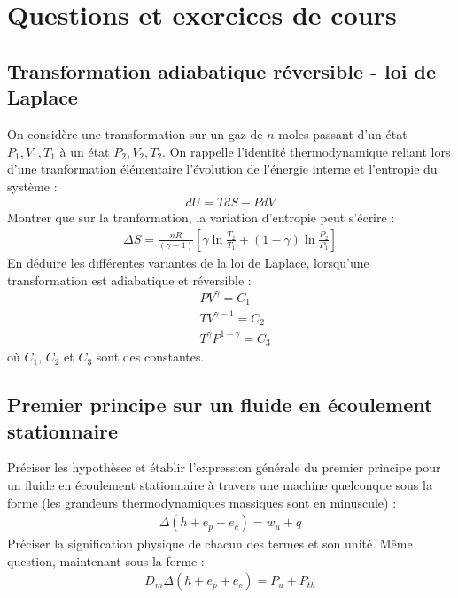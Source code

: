 \documentclass{report}
\begin{document}
\section*{Questions et exercices de cours}

\subsection*{Transformation adiabatique réversible - loi de Laplace}

On considère une transformation sur un gaz de $n$ moles passant d'un état $P_1,V_1,T_1$ à un état $P_2,V_2,T_2$. On rappelle l'identité thermodynamique reliant lors d'une tranformation élémentaire l'évolution de l'énergie interne et l'entropie du système :
\begin{align*}
	dU=TdS-PdV
\end{align*}
Montrer que sur la tranformation, la variation d'entropie peut s'écrire :
\begin{align*}
	\Delta S=\frac{nR}{(\gamma-1)}\left[\gamma\ln\frac{T_2}{T_1}+(1-\gamma)\ln\frac{P_2}{P_1} \right] 
\end{align*}
En déduire les différentes variantes de la loi de Laplace, lorsqu'une transformation est adiabatique et réversible :
\begin{align*}
	&PV^\gamma=C_1 \\
	&TV^{\gamma-1}=C_2 \\
	&T^{\gamma}P^{1-\gamma}=C_3
\end{align*}
où $C_1$, $C_2$ et $C_3$ sont des constantes.





\subsection*{Premier principe sur un fluide en écoulement stationnaire}

Préciser les hypothèses et établir l'expression générale du premier principe pour un fluide en écoulement stationnaire à travers une machine quelconque sous la forme (les grandeurs thermodynamiques massiques sont en minuscule) :
\begin{align*}
	\Delta (h+e_p+e_c)=w_u+q
\end{align*}
Préciser la signification physique de chacun des termes et son unité.
Même question, maintenant sous la forme :
\begin{align*}
	D_m\Delta (h+e_p+e_c)=P_u+P_{th}
\end{align*}
\end{document}

